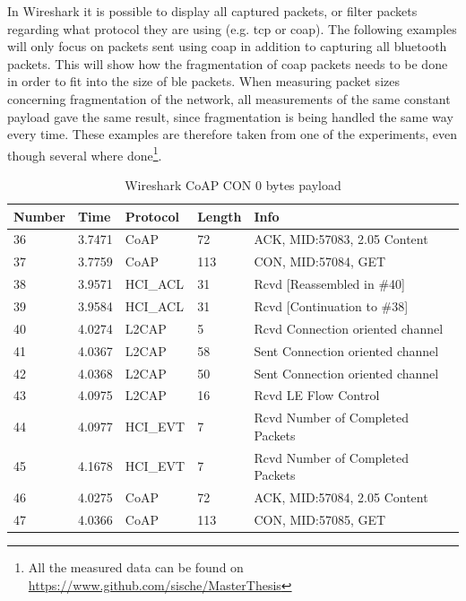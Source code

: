 
\noindent In Wireshark it is possible to display all captured packets, or filter packets regarding what protocol they are using (e.g. \gls{tcp} or \gls{coap}). The following examples will only focus on packets sent using \gls{coap} in addition to capturing all bluetooth packets. This will show how the fragmentation of \gls{coap} packets needs to be done in order to fit into the size of \gls{ble} packets. When measuring packet sizes concerning fragmentation of the network, all measurements of the same constant \gls{payload} gave the same result, since fragmentation is being handled the same way every time. These examples are therefore taken from one of the experiments, even though several where done\footnote{All the measured data can be found on \url{https://www.github.com/sische/MasterThesis}}. 

\begin{table}[ht]
\centering
\caption{Wireshark CoAP CON 0 bytes payload}
\label{coapCON0table}
\begin{tabular}{lllll}
Number & Time   & Protocol & Length & Info                             \\ \hline
36     & 3.7471 & CoAP     & 72     & ACK, MID:57083, 2.05 Content     \\
37     & 3.7759 & CoAP     & 113    & CON, MID:57084, GET              \\
38     & 3.9571 & HCI\_ACL & 31     & Rcvd {[}Reassembled in \#40{]}   \\
39     & 3.9584 & HCI\_ACL & 31     & Rcvd {[}Continuation to \#38{]}  \\
40     & 4.0274 & L2CAP    & 5      & Rcvd Connection oriented channel \\
41     & 4.0367 & L2CAP    & 58     & Sent Connection oriented channel \\
42     & 4.0368 & L2CAP    & 50     & Sent Connection oriented channel \\
43     & 4.0975 & L2CAP    & 16     & Rcvd LE Flow Control             \\
44     & 4.0977 & HCI\_EVT & 7      & Rcvd Number of Completed Packets \\
45     & 4.1678 & HCI\_EVT & 7      & Rcvd Number of Completed Packets \\
46     & 4.0275 & CoAP     & 72     & ACK, MID:57084, 2.05 Content     \\
47     & 4.0366 & CoAP     & 113    & CON, MID:57085, GET              \\ \hline
\end{tabular}
\end{table}

